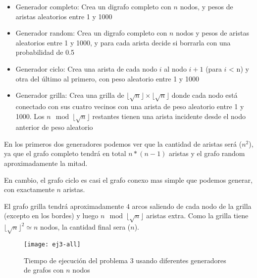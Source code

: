 \begin{itemize}

    \item Generador completo: Crea un digrafo completo con $n$ nodos, y pesos de aristas aleatorios entre 1 y 1000

    \item Generador random: Crea un digrafo completo con $n$ nodos y pesos de aristas aleatorios entre 1 y 1000, y para cada arista decide si borrarla con una probabilidad de 0.5

    \item Generador ciclo: Crea una arista de cada nodo $i$ al nodo $i+1$ (para $i$ < n) y otra del último al primero, con peso aleatorio entre 1 y 1000

    \item Generador grilla: Crea una grilla de $\lfloor \sqrt{n} \rfloor \times \lfloor \sqrt{n} \rfloor$ donde cada nodo está conectado con sus cuatro vecinos con una arista de peso aleatorio entre 1 y 1000. Los $n \mod \lfloor \sqrt{n} \rfloor$ restantes tienen una arista incidente desde el nodo anterior de peso aleatorio

\end{itemize}

En los primeros dos generadores podemos ver que la cantidad de aristas será \bigo($n^2$), ya que el grafo completo tendrá en total $n * (n-1)$ aristas y el grafo random aproximadamente la mitad.

En cambio, el grafo ciclo es casi el grafo conexo mas simple que podemos generar, con exactamente $n$ aristas.

El grafo grilla tendrá aproximadamente $4$ arcos saliendo de cada nodo de la grilla (excepto en los bordes) y luego $n \mod \lfloor \sqrt{n} \rfloor$ aristas extra. Como la grilla tiene $\lfloor \sqrt{n} \rfloor^2 \simeq n$ nodos, la cantidad final sera \bigo($n$).

    \begin{figure}[H]
    	\centering
    	\texttt{[image: ej3-all]}
    	\caption{Tiempo de ejecución del problema 3 usando diferentes generadores de grafos con $n$ nodos}
    	\label{fig:ej3-all}
    \end{figure}

